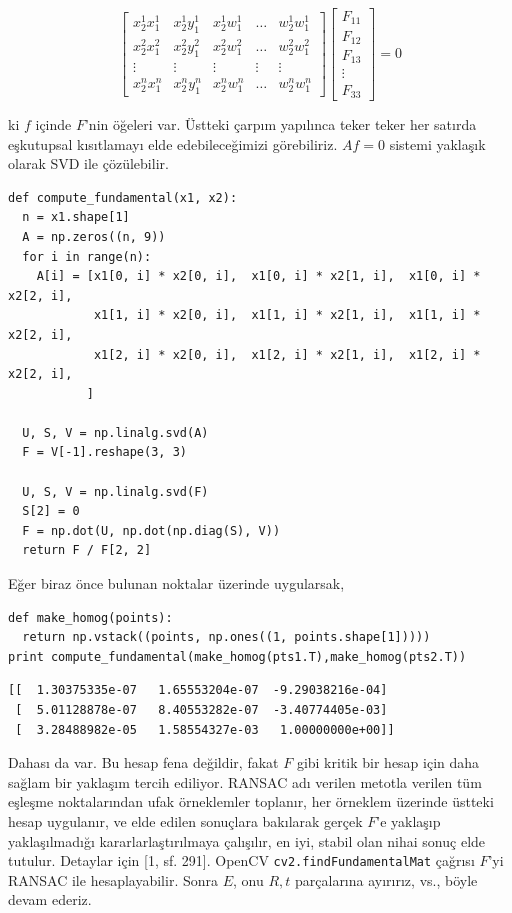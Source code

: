 \documentclass[12pt,fleqn]{article}\usepackage{../../common}
\begin{document}
$$ 
\left[\begin{array}{ccccc}
x_2^1x_1^1 & x_2^1y_1^1 & x_2^1w_1^1 & \dots & w_2^1w_1^1 \\
x_2^2x_1^2 & x_2^2y_1^2 & x_2^2w_1^2 & \dots & w_2^2w_1^2 \\
\vdots & \vdots & \vdots & \vdots & \vdots  \\
x_2^nx_1^n & x_2^ny_1^n & x_2^nw_1^n & \dots & w_2^nw_1^n
\end{array}\right]
\left[\begin{array}{c}
F_{11} \\ F_{12} \\ F_{13} \\ \vdots \\ F_{33} 
\end{array}\right] = 0
$$

ki $f$ içinde $F$'nin öğeleri var. Üstteki çarpım yapılınca teker teker her
satırda eşkutupsal kısıtlamayı elde edebileceğimizi görebiliriz. $Af = 0$
sistemi yaklaşık olarak SVD ile çözülebilir.

\begin{verbatim}
def compute_fundamental(x1, x2):
  n = x1.shape[1]
  A = np.zeros((n, 9))
  for i in range(n):
    A[i] = [x1[0, i] * x2[0, i],  x1[0, i] * x2[1, i],  x1[0, i] * x2[2, i],
            x1[1, i] * x2[0, i],  x1[1, i] * x2[1, i],  x1[1, i] * x2[2, i],
            x1[2, i] * x2[0, i],  x1[2, i] * x2[1, i],  x1[2, i] * x2[2, i],
           ]

  U, S, V = np.linalg.svd(A)
  F = V[-1].reshape(3, 3)

  U, S, V = np.linalg.svd(F)
  S[2] = 0
  F = np.dot(U, np.dot(np.diag(S), V))
  return F / F[2, 2]
\end{verbatim}

Eğer biraz önce bulunan noktalar üzerinde uygularsak,

\begin{verbatim}
def make_homog(points):
  return np.vstack((points, np.ones((1, points.shape[1]))))
print compute_fundamental(make_homog(pts1.T),make_homog(pts2.T))
\end{verbatim}

\begin{verbatim}
[[  1.30375335e-07   1.65553204e-07  -9.29038216e-04]
 [  5.01128878e-07   8.40553282e-07  -3.40774405e-03]
 [  3.28488982e-05   1.58554327e-03   1.00000000e+00]]
\end{verbatim}

Dahası da var. Bu hesap fena değildir, fakat $F$ gibi kritik bir hesap için
daha sağlam bir yaklaşım tercih ediliyor. RANSAC adı verilen metotla
verilen tüm eşleşme noktalarından ufak örneklemler toplanır, her örneklem
üzerinde üstteki hesap uygulanır, ve elde edilen sonuçlara bakılarak gerçek
$F$'e yaklaşıp yaklaşılmadığı kararlarlaştırılmaya çalışılır, en iyi,
stabil olan nihai sonuç elde tutulur. Detaylar için [1, sf. 291]. OpenCV
\verb!cv2.findFundamentalMat! çağrısı $F$'yi RANSAC ile
hesaplayabilir. Sonra $E$, onu $R,t$ parçalarına ayırırız, vs., böyle devam
ederiz.
\end{document}
